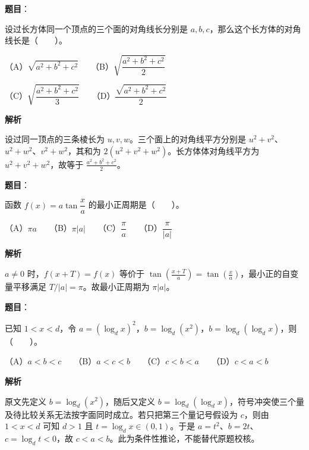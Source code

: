 \begin{answer}

\textbf{题目}：

设过长方体同一个顶点的三个面的对角线长分别是 $a,b,c$，那么这个长方体的对角线长是\mbox{（　　）}。

（A）$\sqrt{a^2+b^2+c^2}$　　（B）$\sqrt{\dfrac{a^2+b^2+c^2}{2}}$

（C）$\sqrt{\dfrac{a^2+b^2+c^2}{3}}$　　（D）$\dfrac{\sqrt{a^2+b^2+c^2}}{2}$

\textbf{解析}

设过同一顶点的三条棱长为 $u,v,w$。三个面上的对角线平方分别是 $u^2+v^2$、$u^2+w^2$、$v^2+w^2$，其和为 $2(u^2+v^2+w^2)$。长方体体对角线平方为 $u^2+v^2+w^2$，故等于 $\frac{a^2+b^2+c^2}{2}$。


\end{answer}
\begin{answer}

\textbf{题目}：

函数 $f(x)=a\tan\dfrac xa$ 的最小正周期是\mbox{（　　）}。

（A）$\pi a$　　（B）$\pi|a|$　　（C）$\dfrac\pi a$　　（D）$\dfrac\pi{|a|}$

\textbf{解析}

$a\ne0$ 时，$f(x+T)=f(x)$ 等价于 $\tan(\frac{x+T}{a})=\tan(\frac xa)$，最小正的自变量平移满足 $T/|a|=\pi$。故最小正周期为 $\pi|a|$。


\end{answer}
\begin{answer}

\textbf{题目}：

已知 $1<x<d$，令 $a=(\log_d x)^2$，$b=\log_d(x^2)$，$b=\log_d(\log_d x)$，则\mbox{（　　）}。

（A）$a<b<c$　　（B）$a<c<b$　　（C）$c<b<a$　　（D）$c<a<b$

\textbf{解析}

原文先定义 $b=\log_d(x^2)$，随后又定义 $b=\log_d(\log_d x)$，符号冲突使三个量及待比较关系无法按字面同时成立。若只把第三个量记号假设为 $c$，则由 $1<x<d$ 可知 $d>1$ 且 $t=\log_d x\in(0,1)$。于是 $a=t^2$、$b=2t$、$c=\log_d t<0$，故 $c<a<b$。此为条件性推论，不能替代原题校核。


\end{answer}
